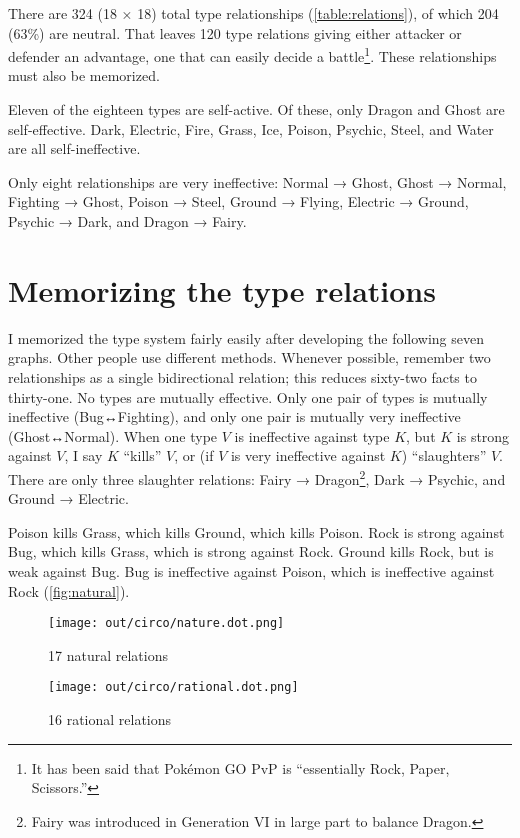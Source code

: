 There are 324 (18 × 18) total type relationships (\autoref{table:relations}),
  of which 204 (63\%) are neutral.
That leaves 120 type relations giving either attacker or defender an advantage,
  one that can easily decide a battle\footnote{It has been said that Pokémon GO PvP is ``essentially Rock, Paper, Scissors.''}.
These relationships must also be memorized.



Eleven of the eighteen types are self-active.
Of these, only Dragon and Ghost are self-effective.
Dark, Electric, Fire, Grass, Ice, Poison, Psychic, Steel, and Water are all self-ineffective.%

Only eight relationships are very ineffective:
Normal → Ghost,
Ghost → Normal,
Fighting → Ghost,
Poison → Steel,
Ground → Flying,
Electric → Ground,
Psychic → Dark,
and Dragon → Fairy.

\section{Memorizing the type relations}
I memorized the type system fairly easily after developing the following seven graphs.
Other people use different methods.
Whenever possible, remember two relationships as a single bidirectional relation;
  this reduces sixty-two facts to thirty-one.
No types are mutually effective.
Only one pair of types is mutually ineffective (Bug↔Fighting),
  and only one pair is mutually very ineffective (Ghost↔Normal).
When one type $V$ is ineffective against type $K$, but $K$ is strong
 against $V$, I say $K$ ``kills'' $V$, or
 (if $V$ is very ineffective against $K$) ``slaughters'' $V$.
There are only three slaughter relations: Fairy → Dragon\footnote{Fairy was
  introduced in Generation VI in large part to balance Dragon.}, Dark → Psychic,
  and Ground → Electric.
\clearpage

\noindent{}Poison kills Grass, which kills Ground, which kills Poison.
Rock is strong against Bug, which kills Grass, which is strong against Rock.
Ground kills Rock, but is weak against Bug.
Bug is ineffective against Poison, which is ineffective against Rock (\autoref{fig:natural}).
\begin{figure}[h!]
\begin{minipage}[t]{0.5\textwidth}
\centering
\texttt{[image: out/circo/nature.dot.png]}
\caption{17 natural relations\label{fig:natural}}
\end{minipage}
\begin{minipage}[t]{0.5\textwidth}
\centering
\texttt{[image: out/circo/rational.dot.png]}
\caption{16 rational relations\label{fig:rational}}
\end{minipage}
\end{figure}

